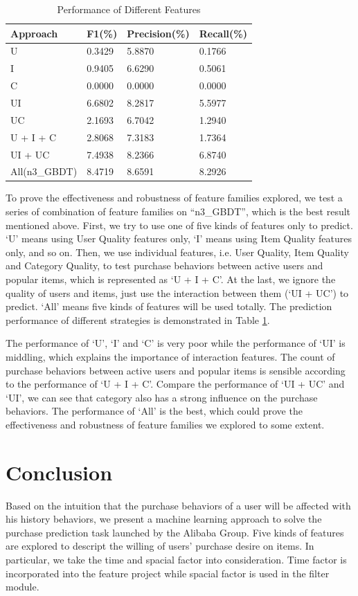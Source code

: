 \documentclass{llncs}
\begin{document}
\begin{table}[htbp]
	\normalsize
	\centering
	\caption{Performance of Different Features}
	\begin{tabular}{|p{56pt}|p{48pt}|p{48pt}|p{48pt}|}
		\hline
		Approach & F1(\%) & Precision(\%) & Recall(\%) \\
		\hline
		U & 0.3429 & 5.8870 & 0.1766 \\
		I & 0.9405 & 6.6290 & 0.5061 \\
		C & 0.0000 & 0.0000 & 0.0000 \\
		UI & 6.6802 & 8.2817 & 5.5977 \\
		UC & 2.1693 & 6.7042 & 1.2940 \\
		\hline
		U + I + C & 2.8068 & 7.3183 & 1.7364 \\
		UI + UC & 7.4938 & 8.2366 & 6.8740 \\
		\hline
		All(n3\_GBDT) & 8.4719 & 8.6591 & 8.2926 \\
		\hline
	\end{tabular}
	\label{tab:fea}
\end{table}

To prove the effectiveness and robustness of feature families explored,
we test a series of combination of feature families on 
``n3\_GBDT'', which is the best result mentioned above.
First, we try to use one of five kinds of features only to predict.
`U' means using User Quality features only,
`I' means using Item Quality features only,
and so on.
Then, we use individual features, i.e.
User Quality, Item Quality and Category Quality,
to test purchase behaviors between active users and popular items,
which is represented as `U + I + C'.
At the last, we ignore the quality of users and items,
just use the interaction between them (`UI + UC') to predict.
`All' means five kinds of features will be used totally.
The prediction performance of different strategies is demonstrated in Table \ref{tab:fea}.

The performance of `U', `I' and `C' is very poor while the performance of `UI' is middling,
which explains the importance of interaction features.
The count of purchase behaviors between active users and popular items is sensible
according to the performance of `U + I + C'.
Compare the performance of `UI + UC' and `UI', we can see that
category also has a strong influence on the purchase behaviors.
The performance of `All' is the best, which could prove the effectiveness and
robustness of feature families we explored to some extent.


\section{Conclusion}
Based on the intuition that the purchase behaviors of a user
will be affected with his history behaviors,
we present a machine learning approach to solve
the purchase prediction task launched by the Alibaba Group.
Five kinds of features are explored to descript
the willing of users' purchase desire on items.
In particular, we take the time and spacial factor into consideration.
Time factor is incorporated into the feature project while
spacial factor is used in the filter module.
\end{document}
